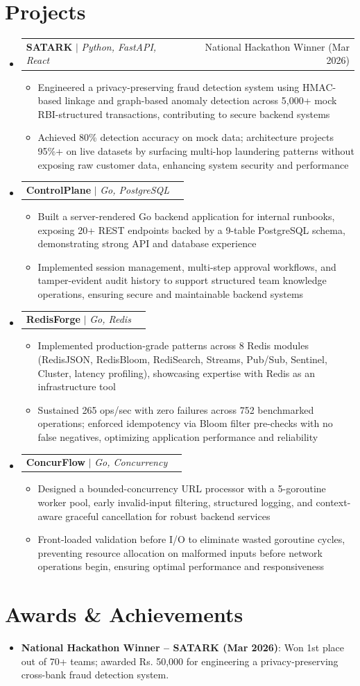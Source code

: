 \documentclass[letterpaper,10pt]{article}
\makeatletter
\newcommand{\resumeItem}[1]{
  \item\small{
    {#1 \vspace{-2pt}}
  }
}
\newcommand{\resumeProjectHeading}[2]{
    \item
    \begin{tabular*}{0.97\textwidth}{l@{\extracolsep{\fill}}r}
      \small#1 & #2 \\
    \end{tabular*}\vspace{-7pt}
}
\newcommand{\resumeSubHeadingListStart}{\begin{itemize}[leftmargin=0.15in, label={}]}
\newcommand{\resumeSubHeadingListEnd}{\end{itemize}}
\newcommand{\resumeItemListStart}{\begin{itemize}}
\newcommand{\resumeItemListEnd}{\end{itemize}\vspace{-5pt}}
\makeatother
\begin{document}
\section{Projects}
  \resumeSubHeadingListStart
        \resumeProjectHeading{\textbf{SATARK} $|$ \textit{Python, FastAPI, React}}{National Hackathon Winner (Mar 2026)}
    \resumeItemListStart
      \resumeItem{Engineered a privacy-preserving fraud detection system using HMAC-based linkage and graph-based anomaly detection across 5,000+ mock RBI-structured transactions, contributing to secure backend systems}
      \resumeItem{Achieved 80\% detection accuracy on mock data; architecture projects 95\%+ on live datasets by surfacing multi-hop laundering patterns without exposing raw customer data, enhancing system security and performance}
    \resumeItemListEnd
    \resumeProjectHeading{\textbf{ControlPlane} $|$ \textit{Go, PostgreSQL}}{}
    \resumeItemListStart
      \resumeItem{Built a server-rendered Go backend application for internal runbooks, exposing 20+ REST endpoints backed by a 9-table PostgreSQL schema, demonstrating strong API and database experience}
      \resumeItem{Implemented session management, multi-step approval workflows, and tamper-evident audit history to support structured team knowledge operations, ensuring secure and maintainable backend systems}
    \resumeItemListEnd
    \resumeProjectHeading{\textbf{RedisForge} $|$ \textit{Go, Redis}}{}
    \resumeItemListStart
      \resumeItem{Implemented production-grade patterns across 8 Redis modules (RedisJSON, RedisBloom, RediSearch, Streams, Pub/Sub, Sentinel, Cluster, latency profiling), showcasing expertise with Redis as an infrastructure tool}
      \resumeItem{Sustained 265 ops/sec with zero failures across 752 benchmarked operations; enforced idempotency via Bloom filter pre-checks with no false negatives, optimizing application performance and reliability}
    \resumeItemListEnd
    \resumeProjectHeading{\textbf{ConcurFlow} $|$ \textit{Go, Concurrency}}{}
    \resumeItemListStart
      \resumeItem{Designed a bounded-concurrency URL processor with a 5-goroutine worker pool, early invalid-input filtering, structured logging, and context-aware graceful cancellation for robust backend services}
      \resumeItem{Front-loaded validation before I/O to eliminate wasted goroutine cycles, preventing resource allocation on malformed inputs before network operations begin, ensuring optimal performance and responsiveness}
    \resumeItemListEnd
  \resumeSubHeadingListEnd

\section{Awards \& Achievements}
  \resumeSubHeadingListStart
        \item \textbf{National Hackathon Winner -- SATARK (Mar 2026)}: Won 1st place out of 70+ teams; awarded Rs. 50,000 for engineering a privacy-preserving cross-bank fraud detection system.
  \resumeSubHeadingListEnd
\end{document}
